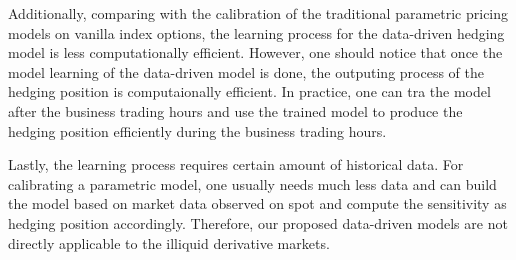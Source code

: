 \documentclass[letterpaper,12pt,titlepage,oneside,final]{book}
\numberwithin{equation}{section}
\theoremstyle{definition}
\begin{document}
Additionally, comparing with the calibration of the traditional parametric pricing models on vanilla index options, the learning process for the data-driven hedging model is less computationally efficient. However, one should notice that once the model learning of the data-driven model is done, the outputing process of the hedging position is computaionally efficient. In practice, one can tra the model after the business trading hours and use  the trained model to produce the hedging position efficiently  during the business trading hours.

Lastly, the learning process requires certain amount of historical data. For calibrating a parametric model, one usually needs much less data and  can  build the model based on market data observed on spot and compute the sensitivity as hedging position accordingly.  Therefore, our proposed data-driven models are not directly applicable to the illiquid derivative markets.  
\end{document}
